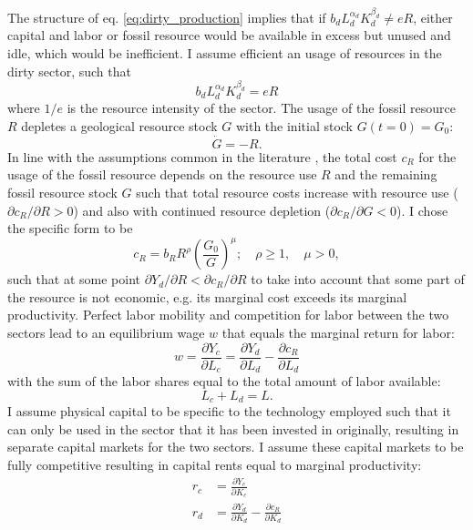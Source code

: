 The structure of eq. \ref{eq:dirty_production} implies that if $b_d L_d^{\alpha_d}K_d^{\beta_d} \ne e R$, either capital and labor or fossil resource would be available in excess but unused and idle, which would be inefficient. I assume efficient an usage of resources in the dirty sector, such that
\begin{equation}
    b_d L_d^{\alpha_d}K_d^{\beta_d} = e R
    \label{eq:efficient_dirty_resources}
\end{equation}
where $1/e$ is the resource intensity of the sector. The usage of the fossil resource $R$ depletes a geological resource stock $G$ with the initial stock $G(t=0) = G_0$:
\begin{equation}
    \dot{G} = -R. 
    \label{eq:resource_depletion}
\end{equation} 
In line with the assumptions common in the literature \citep{Dasgupta1974, Perman2003}, the total cost $c_R$ for the usage of the fossil resource depends on the resource use $R$ and the remaining fossil resource stock $G$ such that total resource costs increase with resource use ($\partial c_R / \partial R >0$) and also with continued resource depletion ($\partial c_R / \partial G < 0$). I chose the specific form to be
\begin{equation}
	c_R = b_R R^{\rho}\left( \frac{G_0}{G} \right)^{\mu}; \quad \rho \geq 1, \quad \mu > 0,
	\label{eq:resource_cost}
\end{equation}
such that at some point $\partial Y_d / \partial R < \partial c_R / \partial R$ to take into account that some part of the resource is not economic, e.g. its marginal cost exceeds its marginal productivity.
Perfect labor mobility and competition for labor between the two sectors lead to an equilibrium wage $w$ that equals the marginal return for labor:
\begin{equation}
	w = \frac{\partial Y_c}{\partial L_c} = \frac{\partial Y_d}{\partial L_d} - \frac{\partial c_R}{\partial L_d}
	\label{eq:equilibrium_wage}
\end{equation}
with the sum of the labor shares equal to the total amount of labor available:
\begin{equation}
	L_c + L_d = L.
	\label{eq:population}
\end{equation}
I assume physical capital to be specific to the technology employed such that it can only be used in the sector that it has been invested in originally, resulting in separate capital markets for the two sectors. I assume these capital markets to be fully competitive resulting in capital rents equal to marginal productivity:
\begin{align}
	r_c &= \frac{\partial Y_c}{\partial K_c} \label{eq:clean_capital_rent}\\
	r_d &= \frac{\partial Y_d}{\partial K_d} - \frac{\partial c_R}{\partial K_d} \label{eq:dirty_capital_rent}
\end{align}

